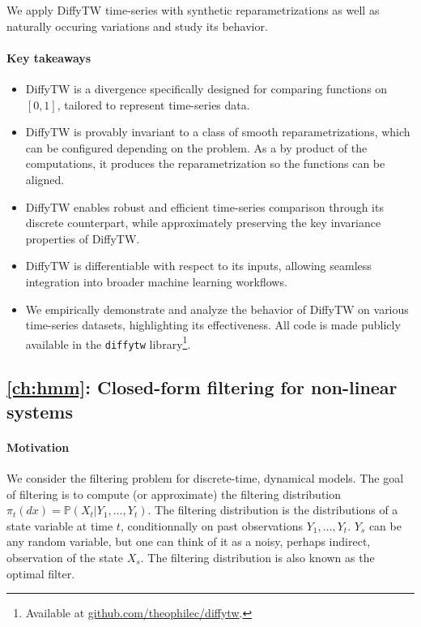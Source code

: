 We apply DiffyTW time-series with synthetic reparametrizations as well as naturally occuring variations and study its behavior.

\paragraph{Key takeaways}
\begin{itemize}
    \item DiffyTW is a divergence specifically designed for comparing functions on $[0,1]$, tailored to represent time-series data.
    \item DiffyTW is provably invariant to a class of smooth reparametrizations, which can be configured depending on the problem. As a by product of the computations, it produces the reparametrization so the functions can be aligned.
    \item DiffyTW enables robust and efficient time-series comparison through its discrete counterpart, while approximately preserving the key invariance properties of DiffyTW.
    \item DiffyTW is differentiable with respect to its inputs, allowing seamless integration into broader machine learning workflows.
    \item We empirically demonstrate and analyze the behavior of DiffyTW on various time-series datasets, highlighting its effectiveness. All code is made publicly available in the \texttt{diffytw} library\footnote{Available at \url{github.com/theophilec/diffytw}.}.
\end{itemize}

\newpage
\subsection*{\cref{ch:hmm}: Closed-form filtering for non-linear systems}

\paragraph{Motivation}
We consider the filtering problem for discrete-time, dynamical models. The goal of filtering is to compute (or approximate) the filtering distribution $\pi_t(dx) = \mathbb P(X_t\vert Y_1, \ldots, Y_{t})$. The filtering distribution is the distributions of a state variable at time $t$, conditionnally on past observations $Y_1, \ldots, Y_t$. $Y_s$ can be any random variable, but one can think of it as a noisy, perhaps indirect, observation of the state $X_s$. The filtering distribution is also known as the optimal filter.

